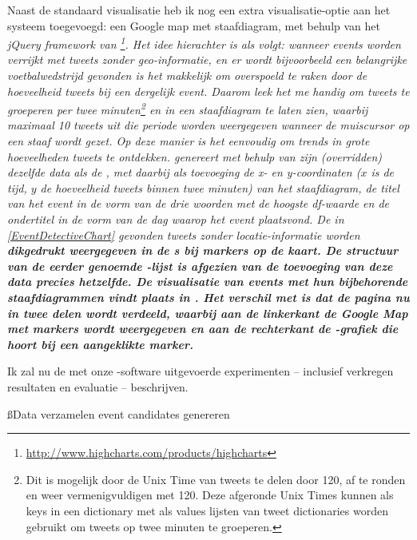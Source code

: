 {{Naast de standaard visualisatie heb ik nog een extra visualisatie-optie aan het systeem 
toegevoegd: een Google map met staafdiagram, met behulp van het \it{jQuery framework} van 
\footnote{\url{http://www.highcharts.com/products/highcharts}}. 
Het idee hierachter is als volgt: wanneer events worden verrijkt 
met tweets zonder geo-informatie, en er wordt bijvoorbeeld een belangrijke 
voetbalwedstrijd gevonden is het makkelijk om overspoeld te raken door de 
hoeveelheid tweets bij een dergelijk event. Daarom leek het me handig om tweets te 
groeperen per twee minuten\footnote{Dit is mogelijk door de Unix Time van tweets 
te delen door 120, af te ronden en weer vermenigvuldigen met 120. Deze afgeronde 
Unix Times kunnen als keys in een dictionary met als values lijsten van tweet 
dictionaries worden gebruikt om tweets op twee minuten te groeperen.} en in een 
staafdiagram te laten zien, waarbij maximaal 10 tweets uit die periode worden 
weergegeven wanneer de muiscursor op een staaf wordt gezet. Op deze manier is 
het eenvoudig om trends in grote hoeveelheden tweets te ontdekken.
\vl
{} genereert met behulp van zijn (\it{overridden})  
dezelfde data als de , met daarbij als toevoeging de \it{x- en 
y-coordinaten} ($x$ is de tijd, $y$ de hoeveelheid tweets binnen twee minuten) van 
het staafdiagram, de \it{titel van het event} in de vorm van de drie woorden met de 
hoogste df-waarde en de \it{ondertitel} in de vorm van de dag waarop het event 
plaatsvond. De in \ref{EventDetectiveChart} gevonden tweets zonder locatie-informatie worden 
\bf{dikgedrukt} weergegeven in de s bij markers op de kaart. De structuur 
van de eerder genoemde -lijst is afgezien van de toevoeging van deze 
data precies hetzelfde.
\vl
De visualisatie van events met hun bijbehorende staafdiagrammen vindt plaats in 
. Het verschil met  is dat de pagina nu 
in twee delen wordt verdeeld, waarbij aan de linkerkant de Google Map met 
markers wordt weergegeven en aan de rechterkant de -grafiek die hoort 
bij een aangeklikte marker.


Ik zal nu de met onze -software uitgevoerde experimenten – inclusief verkregen resultaten 
en evaluatie – beschrijven.

\ss{Data verzamelen event candidates genereren}

}}
